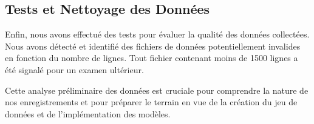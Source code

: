 \subsection{Tests et Nettoyage des Données}
Enfin, nous avons effectué des tests pour évaluer la qualité des données collectées. Nous avons détecté et identifié des fichiers de données potentiellement invalides en fonction du nombre de lignes. Tout fichier contenant moins de 1500 lignes a été signalé pour un examen ultérieur.

Cette analyse préliminaire des données est cruciale pour comprendre la nature de nos enregistrements et pour préparer le terrain en vue de la création du jeu de données et de l'implémentation des modèles.
